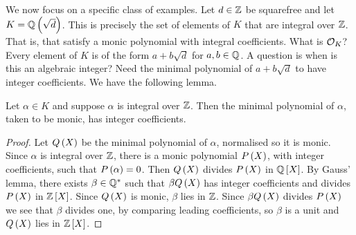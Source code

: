 We now focus on a specific class of examples. Let $ d \in \mathbb{Z} $ be squarefree and let $ K = \mathbb{Q}\left( \sqrt{d} \right) $. This is precisely the set of elements of $ K $ that are integral over $ \mathbb{Z} $. That is, that satisfy a monic polynomial with integral coefficients. What is $ \mathcal{O}_K $? Every element of $ K $ is of the form $ a + b\sqrt{d} $ for $ a, b \in \mathbb{Q} $. A question is when is this an algebraic integer? Need the minimal polynomial of $ a + b\sqrt{d} $ to have integer coefficients. We have the following lemma.

\begin{lemma}
Let $ \alpha \in K $ and suppose $ \alpha $ is integral over $ \mathbb{Z} $. Then the minimal polynomial of $ \alpha $, taken to be monic, has integer coefficients.
\end{lemma}

\begin{proof}
Let $ Q\left( X \right) $ be the minimal polynomial of $ \alpha $, normalised so it is monic. Since $ \alpha $ is integral over $ \mathbb{Z} $, there is a monic polynomial $ P\left( X \right) $, with integer coefficients, such that $ P\left( \alpha \right) = 0 $. Then $ Q\left( X \right) $ divides $ P\left( X \right) $ in $ \mathbb{Q}\left[ X \right] $. By Gauss' lemma, there exists $ \beta \in \mathbb{Q}^* $ such that $ \beta Q\left( X \right) $ has integer coefficients and divides $ P\left( X \right) $ in $ \mathbb{Z}\left[ X \right] $. Since $ Q\left( X \right) $ is monic, $ \beta $ lies in $ \mathbb{Z} $. Since $ \beta Q\left( X \right) $ divides $ P\left( X \right) $ we see that $ \beta $ divides one, by comparing leading coefficients, so $ \beta $ is a unit and $ Q\left( X \right) $ lies in $ \mathbb{Z}\left[ X \right] $.
\end{proof}

